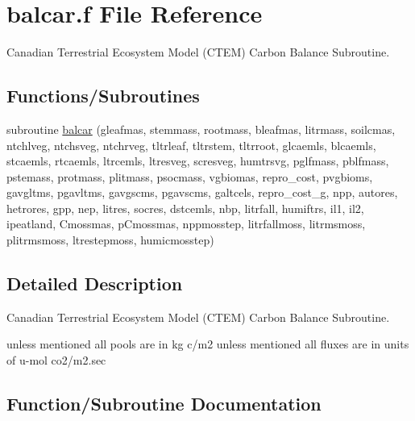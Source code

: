 \hypertarget{balcar_8f}{}\section{balcar.\+f File Reference}
\label{balcar_8f}


Canadian Terrestrial Ecosystem Model (C\+T\+E\+M) Carbon Balance Subroutine.  


\subsection*{Functions/\+Subroutines}
\begin{DoxyCompactItemize}
\item 
subroutine \hyperlink{balcar_8f_a922db81c881d66b3cf76a5a72ea4586a}{balcar} (gleafmas, stemmass, rootmass, bleafmas, litrmass, soilcmas, ntchlveg, ntchsveg, ntchrveg, tltrleaf, tltrstem, tltrroot, glcaemls, blcaemls, stcaemls, rtcaemls, ltrcemls, ltresveg, scresveg, humtrsvg, pglfmass, pblfmass, pstemass, protmass, plitmass, psocmass, vgbiomas, repro\+\_\+cost, pvgbioms, gavgltms, pgavltms, gavgscms, pgavscms, galtcels, repro\+\_\+cost\+\_\+g, npp, autores, hetrores, gpp, nep, litres, socres, dstcemls, nbp, litrfall, humiftrs, il1, il2, ipeatland, Cmossmas, p\+Cmossmas, nppmosstep, litrfallmoss, litrmsmoss, plitrmsmoss, ltrestepmoss, humicmosstep)
\end{DoxyCompactItemize}


\subsection{Detailed Description}
Canadian Terrestrial Ecosystem Model (C\+T\+E\+M) Carbon Balance Subroutine. 

unless mentioned all pools are in kg c/m2 unless mentioned all fluxes are in units of u-\/mol co2/m2.\+sec 

\subsection{Function/\+Subroutine Documentation}
\hypertarget{balcar_8f_a922db81c881d66b3cf76a5a72ea4586a}{}
